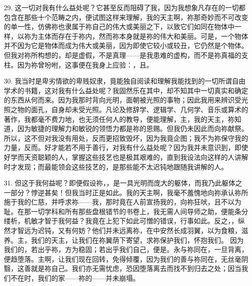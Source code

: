 29. 这一切对我有什么益处呢？它甚至反而阻碍了我，因为我想象凡存在的一切都包含在那些十个范畴之内，便试图这样来理解，我的天主啊，祢那奇妙而不可改变的单一性，仿佛祢也隶属于祢自己的伟大或美丽之下，以致它们如同在物体中一样，以祢为主体而存在于祢内，然而祢本身就是祢的伟大和美丽。可是，一个物体并不因为它是物体而成为伟大或美丽，因为即使它较小或较丑，它仍然是个物体。但我对祢所构想的，却是虚假，不是真理——是我患难的虚构，而不是祢真福的支柱。因为祢曾吩咐，这事便在我身上应验：，且。\par

30. 我当时是卑劣情欲的卑贱奴隶，竟能独自阅读和理解我能找到的一切所谓自由学术的书籍，这对我有什么益处呢？我固然乐在其中，却不知其中一切真实和确定的东西从何而来。因为我那时背向光明，面朝被光照的事物；因此我用来辨识受光照之物的面孔，自身却未受光照。凡论及修辞学、逻辑学、几何学、音乐或算术的著作，我都毫不费力地，也无须任何人的教导，便能理解，主，我的天主，祢知道，因为敏捷的理解力和敏锐的领悟力都是祢的恩赐。但我仍未因此而向祢献祭。所以，这不但对我没有用处，反而更招致毁坏，因为我竟企图；我不为祢保守我的力量，反而。好才能若不用于善行，对我有什么益处呢？因为我并未意识到，即使好学而天资聪颖的人，掌握这些技艺也是极其艰难的，直到我设法向这样的人讲解时才发现；而最能领会这些技艺的，是那些能不太迟钝地跟随我讲解的人。\par

31. 但这于我何益呢？即便假设祢，，是一具光明而庞大的躯体，而我乃此躯体之一部分？悖逆甚矣！但我当时正是如此。我的天主啊，我毫不羞愧地向祢承认祢所施于我的仁慈，并呼求祢——我，那时竟在人前宣扬我的，向祢狂吠，且不以为耻。在那一切学科和所有那些盘根错节的书卷上，我无需人间导师之助，便能条分缕析，机敏才智于我何益？我竟在上犯下如此可憎的错误，行事如此。反之，，纵然才智远为迟钝，又有何妨？他们并未远离祢，在中安然长成羽翼，以为食粮，滋养。主，我们的天主，让我们在祢翼荫下寄望，求祢保护我们，怀抱我们。  因为我们的，若出乎祢，方为稳固；若出乎我们自己，便是。永与祢同在，一旦背离，便趋堕落。主啊，让我们现在回转，免得倾覆，因为我们的善与祢同在，无丝毫阴翳，这善就是祢自己。我们亦无需忧虑，恐因堕落离去而找不到归去之处；因当我们不在时，我们的家——祢的——并未崩塌。\par

